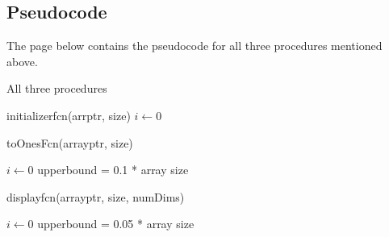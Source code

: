 \documentclass{article}
\begin{document}
\subsection{Pseudocode}
The page below contains the pseudocode for all three procedures mentioned above.
\begin{algorithm}
\caption{All three procedures}
\SetAlgoLined
\DontPrintSemicolon
initializerfcn(arrptr, size)\;
$i \gets 0$\;

toOnesFcn(arrayptr, size)\;

$i \gets 0$\;
upperbound = 0.1 * array size\;

displayfcn(arrayptr, size, numDims)\;

$i \gets 0$\;
upperbound = 0.05 * array size\;
\end{algorithm}
\end{document}
